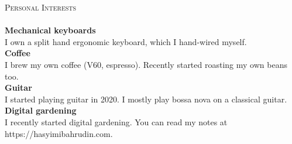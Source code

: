 \documentclass[a4paper]{article}
\newcommand{\lineunder} {
    \vspace*{-8pt} \\
    \hspace*{-18pt} \hrulefill \\
}
\newcommand{\header} [1] {
    {\hspace*{-18pt}\vspace*{6pt} \textsc{#1}}
    \vspace*{-6pt} \lineunder
}
\begin{document}
\header{Personal Interests}
{\textbf{Mechanical keyboards}} \\
I own a split hand ergonomic keyboard, which I hand-wired myself.\\
\vspace*{2mm}
{\textbf{Coffee}} \\
I brew my own coffee (V60, espresso). Recently started roasting my own beans too.\\
\vspace*{2mm}
{\textbf{Guitar}} \\
I started playing guitar in 2020. I mostly play bossa nova on a classical guitar.\\
\vspace*{2mm}
{\textbf{Digital gardening}} \\
I recently started digital gardening. You can read my notes at https://hasyimibahrudin.com.
\ 
\end{document}
